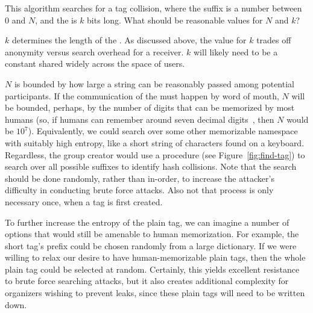 %
This algorithm searches for a tag collision, where the  suffix is
a number between 0 and $N$, and the  is $k$ bits long.
What should be reasonable values for $N$ and $k$?

$k$ determines the length of the . As discussed above, the value for $k$
trades off anonymity versus search overhead for a receiver. $k$ will likely need to be
a constant shared widely across the space of \hoot users.

$N$ is bounded by how large a  string can be reasonably
passed among potential \hoot participants. If the communication of the
 must happen by word of mouth, $N$ will be bounded,
perhaps, by the number of digits that can be memorized by most humans
(so, if humans can remember around seven decimal
digits~\cite{miller56}, then $N$ would be $10^7$). Equivalently, we
could search over some other memorizable namespace with suitably high
entropy, like a short string of characters found on a keyboard.
Regardless, the group creator would use a  procedure (see
Figure~\ref{fig:find-tag}) to search over all possible suffixes to
identify hash collisions. Note that the search should be done
randomly, rather than in-order, to increase the attacker's difficulty
in conducting brute force attacks. Also not that process is only
necessary once, when a tag is first created. 

To further increase the entropy of the plain tag, we can imagine a
number of
options that would still be amenable to human memorization. For
example, the short tag's prefix could be
chosen randomly from a large dictionary.
If we were willing to relax our desire to have human-memorizable
plain tags, then the whole plain tag could be selected at random.
Certainly, this yields excellent resistance to brute force searching
attacks,
but it also creates additional complexity
for organizers wishing to prevent leaks, since these plain tags will need
to be written down.

